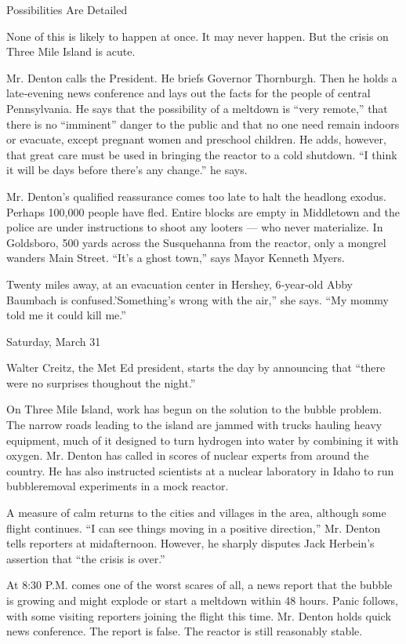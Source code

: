 Possibilities Are Detailed

None of this is likely to happen at once. It may never happen. But the
crisis on Three Mile Island is acute.

Mr. Denton calls the President. He briefs Governor Thornburgh. Then he
holds a late‐evening news conference and lays out the facts for the
people of central Pennsylvania. He says that the possibility of a
meltdown is ``very remote,'' that there is no ``imminent'' danger to the
public and that no one need remain indoors or evacuate, except pregnant
women and preschool children. He adds, however, that great care must be
used in bringing the reactor to a cold shutdown. ``I think it will be
days before there's any change.'' he says.

Mr. Denton's qualified reassurance comes too late to halt the headlong
exodus. Perhaps 100,000 people have fled. Entire blocks are empty in
Middletown and the police are under instructions to shoot any looters
--- who never materialize. In Goldsboro, 500 yards across the
Susquehanna from the reactor, only a mongrel wanders Main Street. ``It's
a ghost town,'' says Mayor Kenneth Myers.

Twenty miles away, at an evacuation center in Hershey, 6‐year‐old Abby
Baumbach is confused.'Something's wrong with the air,'' she says. ``My
mommy told me it could kill me.''

Saturday, March 31

Walter Creitz, the Met Ed president, starts the day by announcing that
``there were no surprises thoughout the night.''

On Three Mile Island, work has begun on the solution to the bubble
problem. The narrow roads leading to the island are jammed with trucks
hauling heavy equipment, much of it designed to turn hydrogen into water
by combining it with oxygen. Mr. Denton has called in scores of nuclear
experts from around the country. He has also instructed scientists at a
nuclear laboratory in Idaho to run bubbleremoval experiments in a mock
reactor.

A measure of calm returns to the cities and villages in the area,
although some flight continues. ``I can see things moving in a positive
direction,'' Mr. Denton tells reporters at midafternoon. However, he
sharply disputes Jack Herbein's assertion that ``the crisis is over.''

At 8:30 P.M. comes one of the worst scares of all, a news report that
the bubble is growing and might explode or start a meltdown within 48
hours. Panic follows, with some visiting reporters joining the flight
this time. Mr. Denton holds quick news conference. The report is false.
The reactor is still reasonably stable.

